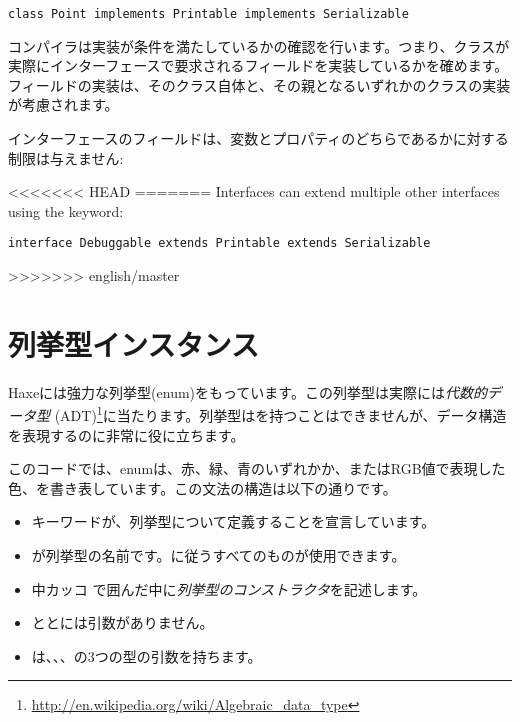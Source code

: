 \begin{lstlisting}
class Point implements Printable implements Serializable
\end{lstlisting}

コンパイラは実装が条件を満たしているかの確認を行います。つまり、クラスが実際にインターフェースで要求されるフィールドを実装しているかを確めます。フィールドの実装は、そのクラス自体と、その親となるいずれかのクラスの実装が考慮されます。

インターフェースのフィールドは、変数とプロパティのどちらであるかに対する制限は与えません:


<<<<<<< HEAD
=======
Interfaces can extend multiple other interfaces using the  keyword:
\begin{lstlisting}
interface Debuggable extends Printable extends Serializable
\end{lstlisting}


>>>>>>> english/master


\section{列挙型インスタンス}
\label{types-enum-instance}

Haxeには強力な列挙型(enum)をもっています。この列挙型は実際には\emph{代数的データ型} (ADT)\footnote{\url{http://en.wikipedia.org/wiki/Algebraic_data_type}}に当たります。列挙型はを持つことはできませんが、データ構造を表現するのに非常に役に立ちます。


このコードでは、enumは、赤、緑、青のいずれかか、またはRGB値で表現した色、を書き表しています。この文法の構造は以下の通りです。

\begin{itemize}
	\item {}キーワードが、列挙型について定義することを宣言しています。
	\item {}が列挙型の名前です。に従うすべてのものが使用できます。
	\item 中カッコ \expr{$\left\{\right\}$} で囲んだ中に\emph{列挙型のコンストラクタ}を記述します。
	\item {}ととには引数がありません。
	\item {}は、、、の3つの型の引数を持ちます。
\end{itemize}

